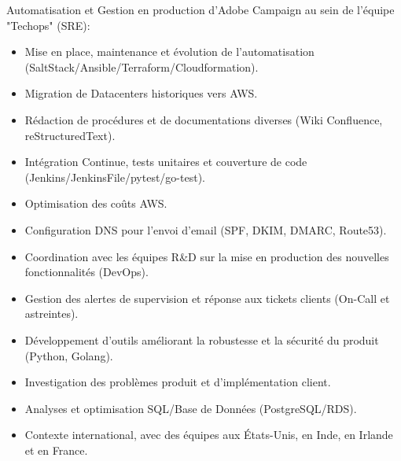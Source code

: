 \documentclass[10pt,a4paper,sans]{moderncv}
\begin{document}
        {}
        {}
        {}
        {Automatisation et Gestion en production d'Adobe Campaign au sein de l'équipe "Techops" (SRE):
            \begin{itemize}
            \item Mise en place, maintenance et évolution de l'automatisation (SaltStack/Ansible/Terraform/Cloudformation).
            \item Migration de Datacenters historiques vers AWS.
            \item Rédaction de procédures et de documentations diverses (Wiki Confluence, reStructuredText).
            \item Intégration Continue, tests unitaires et couverture de code (Jenkins/JenkinsFile/pytest/go-test).
            \item Optimisation des coûts AWS.
            \item Configuration DNS pour l'envoi d'email (SPF, DKIM, DMARC, Route53).
            \item Coordination avec les équipes R\&D sur la mise en production des nouvelles fonctionnalités (DevOps).
            \item Gestion des alertes de supervision et réponse aux tickets clients (On-Call et astreintes).
            \item Développement d'outils améliorant la robustesse et la sécurité du produit (Python, Golang).
            \item Investigation des problèmes produit et d'implémentation client.
            \item Analyses et optimisation SQL/Base de Données (PostgreSQL/RDS).
            \item Contexte international, avec des équipes aux États-Unis, en Inde, en Irlande et en France.
            \end{itemize}
        }
\end{document}
